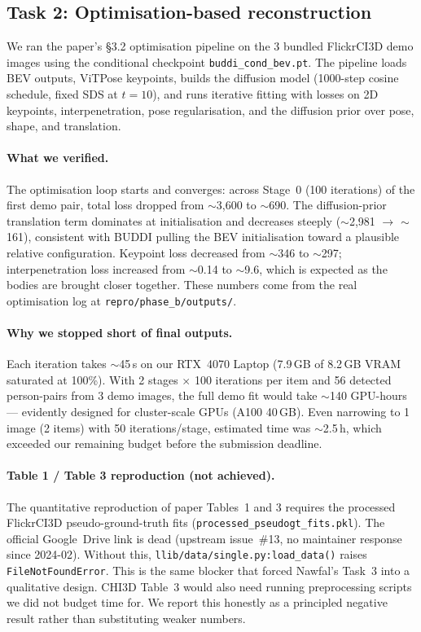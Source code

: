 \documentclass[10pt]{article}
\begin{document}
\subsection{Task 2: Optimisation-based reconstruction}
\label{sec:task2}

We ran the paper's §3.2 optimisation pipeline on the 3 bundled FlickrCI3D demo images using the conditional checkpoint \texttt{buddi\_cond\_bev.pt}. The pipeline loads BEV outputs, ViTPose keypoints, builds the diffusion model (1000-step cosine schedule, fixed SDS at $t{=}10$), and runs iterative fitting with losses on 2D keypoints, interpenetration, pose regularisation, and the diffusion prior over pose, shape, and translation.

\paragraph{What we verified.}
The optimisation loop starts and converges: across Stage~0 (100 iterations) of the first demo pair, total loss dropped from $\sim$3{,}600 to $\sim$690. The diffusion-prior translation term dominates at initialisation and decreases steeply ($\sim$2{,}981 $\to$ $\sim$161), consistent with BUDDI pulling the BEV initialisation toward a plausible relative configuration. Keypoint loss decreased from $\sim$346 to $\sim$297; interpenetration loss increased from $\sim$0.14 to $\sim$9.6, which is expected as the bodies are brought closer together. These numbers come from the real optimisation log at \texttt{repro/phase\_b/outputs/}.

\paragraph{Why we stopped short of final outputs.}
Each iteration takes $\sim$45\,s on our RTX~4070 Laptop (7.9\,GB of 8.2\,GB VRAM saturated at 100\%). With 2 stages $\times$ 100 iterations per item and 56 detected person-pairs from 3 demo images, the full demo fit would take $\sim$140 GPU-hours --- evidently designed for cluster-scale GPUs (A100 40\,GB). Even narrowing to 1 image (2 items) with 50 iterations/stage, estimated time was $\sim$2.5\,h, which exceeded our remaining budget before the submission deadline.

\paragraph{Table 1 / Table 3 reproduction (not achieved).}
The quantitative reproduction of paper Tables~1 and 3 requires the processed FlickrCI3D pseudo-ground-truth fits (\texttt{processed\_pseudogt\_fits.pkl}). The official Google~Drive link is dead (upstream issue~\#13, no maintainer response since 2024-02). Without this, \texttt{llib/data/single.py:load\_data()} raises \texttt{FileNotFoundError}. This is the same blocker that forced Nawfal's Task~3 into a qualitative design. CHI3D Table~3 would also need running preprocessing scripts we did not budget time for. We report this honestly as a principled negative result rather than substituting weaker numbers.
\end{document}
